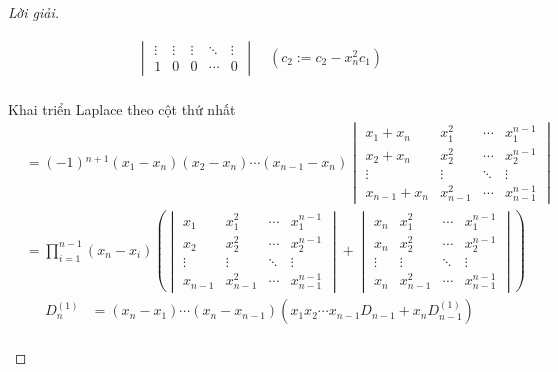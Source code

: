 \documentclass[class=nhvh-linear-algebra,crop=false]{standalone}
\begin{document}
\begin{proof}[Lời giải]
\begin{enumerate}[label = (\alph*)]
\begin{align*}
\begin{vmatrix}
				      \vdots & \vdots                         & \vdots                   & \ddots & \vdots                     \\
				      1      & 0                              & 0                        & \cdots & 0
			      \end{vmatrix}\quad(c_{2}:=c_{2} - x_{n}^{2}c_{1}) \\
		      \end{align*}
		      \par Khai triển Laplace theo cột thứ nhất
		      \begin{align*}
			       & = (-1){}^{n+1}(x_{1} - x_{n})(x_{2} - x_{n})\cdots (x_{n-1} - x_{n})
			      \begin{vmatrix}
				      x_{1} + x_{n}   & x_{1}^{2}   & \cdots & x_{1}^{n-1}   \\
				      x_{2} + x_{n}   & x_{2}^{2}   & \cdots & x_{2}^{n-1}   \\
				      \vdots          & \vdots      & \ddots & \vdots        \\
				      x_{n-1} + x_{n} & x_{n-1}^{2} & \cdots & x_{n-1}^{n-1}
			      \end{vmatrix}                  \\
			       & = \prod^{n-1}_{i=1}(x_{n} - x_{i})\left(
			      \begin{vmatrix}
					      x_{1}   & x_{1}^{2}   & \cdots & x_{1}^{n-1}   \\
					      x_{2}   & x_{2}^{2}   & \cdots & x_{2}^{n-1}   \\
					      \vdots  & \vdots      & \ddots & \vdots        \\
					      x_{n-1} & x_{n-1}^{2} & \cdots & x_{n-1}^{n-1}
				      \end{vmatrix}
			      +
			      \begin{vmatrix}
					      x_{n}  & x_{1}^{2}   & \cdots & x_{1}^{n-1}   \\
					      x_{n}  & x_{2}^{2}   & \cdots & x_{2}^{n-1}   \\
					      \vdots & \vdots      & \ddots & \vdots        \\
					      x_{n}  & x_{n-1}^{2} & \cdots & x_{n-1}^{n-1}
				      \end{vmatrix}
			      \right)
		      \end{align*}
		      \begingroup{}
		      \allowdisplaybreaks{}
		      \begin{align*}
			      D^{(1)}_{n} & = (x_{n} - x_{1})\cdots(x_{n} - x_{n-1})\left( x_{1}x_{2}\cdots x_{n-1} D_{n-1} + x_{n}D^{(1)}_{n-1}\right)                                                                                        \\

\end{align*}
\end{enumerate}
\end{proof}
\end{document}
